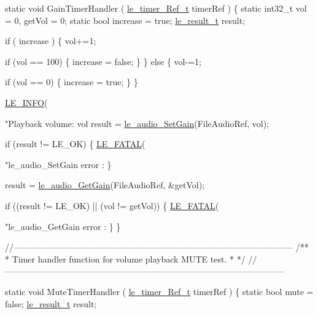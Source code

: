 \begin{DoxyCodeInclude}
\textcolor{keyword}{static} \textcolor{keywordtype}{void} GainTimerHandler
(
    \hyperlink{le__timer_8h_a763fa6992488cdce3b5a820817094838}{le\_timer\_Ref\_t} timerRef
)
\{
    \textcolor{keyword}{static} int32\_t vol = 0, getVol = 0;
    \textcolor{keyword}{static} \textcolor{keywordtype}{bool} increase = \textcolor{keyword}{true};
    \hyperlink{le__basics_8h_a1cca095ed6ebab24b57a636382a6c86c}{le\_result\_t} result;

    \textcolor{keywordflow}{if} ( increase )
    \{
        vol+=1;

        \textcolor{keywordflow}{if} (vol == 100)
        \{
            increase = \textcolor{keyword}{false};
        \}
    \}
    \textcolor{keywordflow}{else}
    \{
        vol-=1;

        \textcolor{keywordflow}{if} (vol == 0)
        \{
            increase = \textcolor{keyword}{true};
        \}
    \}

    \hyperlink{le__log_8h_a23e6d206faa64f612045d688cdde5808}{LE\_INFO}(\textcolor{stringliteral}{"Playback volume: vol %
    result = \hyperlink{le__audio__interface_8h_a65f11540e6af03a3494b6b9be76ba5fc}{le\_audio\_SetGain}(FileAudioRef, vol);

    \textcolor{keywordflow}{if} (result != LE\_OK)
    \{
        \hyperlink{le__log_8h_a54b4b07f5396e19a8d9fca74238f4795}{LE\_FATAL}(\textcolor{stringliteral}{"le\_audio\_SetGain error : %
    \}

    result = \hyperlink{le__audio__interface_8h_a365dede3aa7e895755f5812d89368f9f}{le\_audio\_GetGain}(FileAudioRef, &getVol);

    \textcolor{keywordflow}{if} ((result != LE\_OK) || (vol != getVol))
    \{
        \hyperlink{le__log_8h_a54b4b07f5396e19a8d9fca74238f4795}{LE\_FATAL}(\textcolor{stringliteral}{"le\_audio\_GetGain error : %
    \}
\}

\textcolor{comment}{//--------------------------------------------------------------------------------------------------}\textcolor{comment}{}
\textcolor{comment}{/**}
\textcolor{comment}{ * Timer handler function for volume playback MUTE test.}
\textcolor{comment}{ *}
\textcolor{comment}{ */}
\textcolor{comment}{//--------------------------------------------------------------------------------------------------}

\textcolor{keyword}{static} \textcolor{keywordtype}{void} MuteTimerHandler
(
    \hyperlink{le__timer_8h_a763fa6992488cdce3b5a820817094838}{le\_timer\_Ref\_t} timerRef
)
\{
    \textcolor{keyword}{static} \textcolor{keywordtype}{bool} mute = \textcolor{keyword}{false};
    \hyperlink{le__basics_8h_a1cca095ed6ebab24b57a636382a6c86c}{le\_result\_t} result;

}}}
\end{DoxyCodeInclude}
